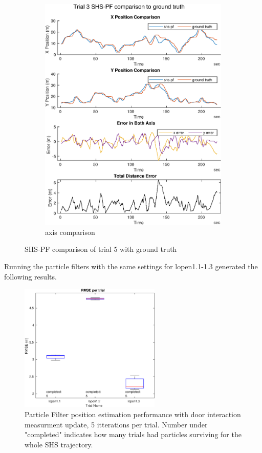 \begin{figure}[H]
\begin{subfigure}[t]{.45\textwidth}
		\includegraphics[width=\linewidth]{images/20201029_1804_shs-pf_trial_3_1}
		\caption{axis comparison}
		\label{fig:shspf_trial3_comparison}
	\end{subfigure}
	\caption{SHS-PF comparison of trial 5 with ground truth}
	\label{fig:shspf_trial3_shs_gt_comparison}
\end{figure}

Running the particle filters with the same settings for lopen1.1-1.3 generated the following results.

\begin{figure}[H]
	\centering
	\includegraphics[width=0.6\textwidth]{images/20201103_1128_with_doors_2}
	\caption[Particle Filter position estimation performance with door interaction]{Particle Filter position estimation performance with door interaction measurment update, 5 itterations per trial. Number under "completed" indicates how many trials had particles surviving for the whole SHS trajectory. }
	
	\label{fig:pf_boxplot}
\end{figure}

